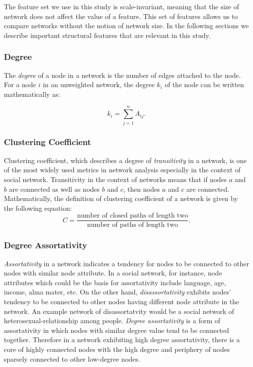 \documentclass[..]{revtex4}
\begin{document}
	The feature set we use in this study is scale-invariant, meaning that the size of network does not affect the value of a feature. This set of features allows us to compare networks without the notion of network size. In the following sections we describe important structural features that are relevant in this study.	
	 
	\subsubsection{Degree}
	The \textit{degree} of a node in a network is the number of edges attached to the node. For a node $i$ in an unweighted network, the degree $k_i$ of the node can be written mathematically as:
	
	\begin{equation}
 	 k_i = \sum_{j = 1}^n A_{ij}.
	\end{equation}

	
	\subsubsection{Clustering Coefficient}
	Clustering coefficient, which describes a degree of \textit{transitivity} in a network, is one of the most widely used metrics in network analysis especially in the context of social network. Transitivity in the context of networks means that if nodes $a$ and $b$ are connected as well as nodes $b$ and $c$, then nodes $a$ and $c$ are connected. Mathematically, the definition of clustering coefficient of a network is given by the following equation:
	\begin{equation}
	C = \frac{\text{number of closed paths of length two}}{\text{number of paths of length two}}.
	\end{equation}
	
	\subsubsection{Degree Assortativity}
	\textit{Assortativity} in a network indicates a tendency for nodes to be connected to other nodes with similar node attribute. In a social network, for instance, node attributes which could be the basis for assortativity include language, age, income, alma mater, etc. On the other hand, \textit{disassortativity} exhibits nodes' tendency to be connected to other nodes having different node attribute in the network. An example network of disassortatvity would be a social network of heterosexual-relationship among people. 
	\textit{Degree assortativity} is a form of assortativity in which nodes with similar degree value tend to be connected together. Therefore in a network exhibiting high degree assortativity, there is a core of highly connected nodes with the high degree and periphery of nodes sparsely connected to other low-degree nodes.
	
\end{document}
